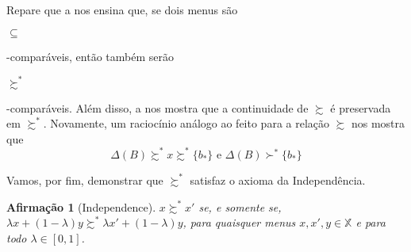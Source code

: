 \documentclass[11pt, a4paper]{article}
\theoremstyle{nonumberplain}
\theoremstyle{plain}
\theoremstyle{plain}
\newtheorem{claim}{Afirmação}
\theoremstyle{plain}
\begin{document}
Repare que a  nos ensina que, se dois menus são \begin{small}$\subseteq$\end{small}-comparáveis, então também serão \begin{small}$\succsim^*$\end{small}-comparáveis. Além disso, a  nos mostra que a continuidade de $\succsim$ é preservada em $\succsim^*$. Novamente, um raciocínio análogo ao feito para a relação $\succsim$ nos mostra que \[\Delta(B)\succsim^* x\succsim^* \{b_*\} \text{ e } \Delta(B)\succ^* \{b_*\}\]

Vamos, por fim, demonstrar que $\succsim^*$ satisfaz o axioma da Independência. 

\begin{claim}[Independence] $x\succsim^*x'$ se, e somente se, $\lambda x + (1-\lambda)y\succsim^* \lambda x' + (1-\lambda)y$, para quaisquer menus $x,x',y\in \mathbb{X}$ e para todo $\lambda \in [0,1]$.\end{claim}
\end{document}
